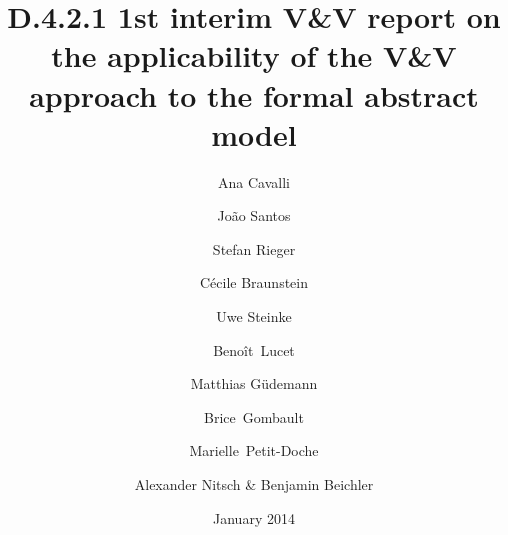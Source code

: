 \documentclass{template/openetcs_article}
\begin{document}
\frontmatter
{}




\title{D.4.2.1 1st interim V\&V report on the applicability of the V\&V approach to the formal abstract model}

\subtitle{}

\date{January 2014}

\author{Ana Cavalli \and João Santos}

  
\author{Stefan Rieger}


\author{Cécile Braunstein}
  
\author{Uwe Steinke}

\author{Benoît~Lucet \and Matthias Güdemann \and Brice~Gombault \and Marielle~Petit-Doche} 


\author{Alexander Nitsch \& Benjamin Beichler}

  

\reporttype{}






\maketitle
\tableofcontents
\listoffiguresandtables
\newpage
\end{document}
